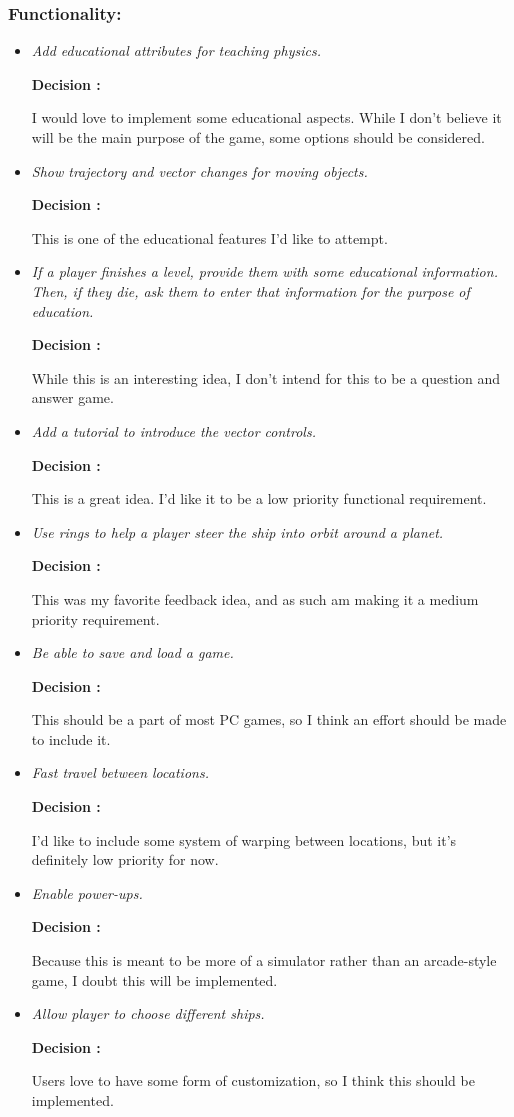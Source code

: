 \subsubsection{Functionality:}
\begin{itemize}
  \item \emph{Add educational attributes for teaching physics.}

        \textbf{Decision : } \parbox[t]{5in}{I would love to implement some educational aspects. While I don't believe it will be the main purpose of the game, some options should be considered.}

  \item \emph{Show trajectory and vector changes for moving objects.}

        \textbf{Decision : } \parbox[t]{5in}{This is one of the educational features I'd like to attempt.}

  \item \emph{If a player finishes a level, provide them with some educational information. Then, if they die, ask them to enter that information for the purpose of education.}

        \textbf{Decision : } \parbox[t]{5in}{While this is an interesting idea, I don't intend for this to be a question and answer game.}

  \item \emph{Add a tutorial to introduce the vector controls.}

        \textbf{Decision : } \parbox[t]{5in}{This is a great idea. I'd like it to be a low priority functional requirement.}

  \item \emph{Use rings to help a player steer the ship into orbit around a planet.}

        \textbf{Decision : } \parbox[t]{5in}{This was my favorite feedback idea, and as such am making it a medium priority requirement.}

  \item \emph{Be able to save and load a game.}

        \textbf{Decision : } \parbox[t]{5in}{This should be a part of most PC games, so I think an effort should be made to include it.}

  \item \emph{Fast travel between locations.}

        \textbf{Decision : } \parbox[t]{5in}{I'd like to include some system of warping between locations, but it's definitely low priority for now.}

  \item \emph{Enable power-ups.}

        \textbf{Decision : } \parbox[t]{5in}{Because this is meant to be more of a simulator rather than an arcade-style game, I doubt this will be implemented.}

  \item \emph{Allow player to choose different ships.}

        \textbf{Decision : } \parbox[t]{5in}{Users love to have some form of customization, so I think this should be implemented.}
\end{itemize}

